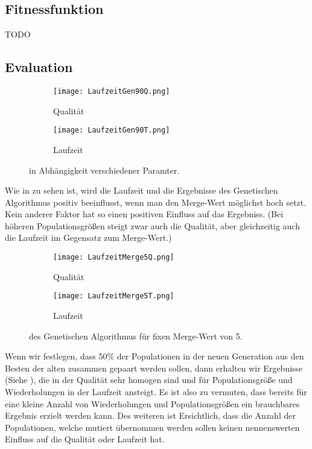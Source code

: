 \subsection{Fitnessfunktion}
TODO



\subsection[Evaluation]{Evaluation\protect\footnotemark}
\label{sec:Evaluation_genAlg}

\begin{figure}
  \begin{subfigure}{\textwidth}
  \texttt{[image: LaufzeitGen90Q.png]}
  \caption{Qualität}
  \end{subfigure}

  \begin{subfigure}{\textwidth}
  \texttt{[image: LaufzeitGen90T.png]}
  \caption{Laufzeit}
  \end{subfigure}
\caption{in Abhängigkeit verschiedener Paramter.}
\label{fig:GenAlgAll}
\end{figure}

Wie in  zu sehen ist, wird die Laufzeit und die Ergebnisse des Genetischen Algorithmus positiv beeinflusst,
wenn man den Merge-Wert möglichst hoch setzt. Kein anderer Faktor hat so einen positiven Einfluss auf das Ergebniss.
(Bei höheren Populationsgrößen steigt zwar auch die Qualität, aber gleichzeitig auch die Laufzeit im Gegensatz zum Merge-Wert.)

\begin{figure}
  \begin{subfigure}{\textwidth}
  \texttt{[image: LaufzeitMerge5Q.png]}
  \caption{Qualität}
  \label{fig:QualitätMerge5}
  \end{subfigure}

  \begin{subfigure}{\textwidth}
  \texttt{[image: LaufzeitMerge5T.png]}
  \caption{Laufzeit}
  \label{fig:LaufzeitMerge5}
  \end{subfigure}
\caption{des Genetischen Algorithmus für fixen Merge-Wert von 5.\protect}
\label{fig:GenAlgMerge5}
\end{figure}

Wenn wir festlegen, dass 50\% der Populationen in der neuen Generation aus den Besten der alten zusammen gepaart werden sollen,
dann erhalten wir Ergebnisse (Siehe ), die in der Qualität sehr homogen sind und für Populationsgröße
und Wiederholungen in der Laufzeit ansteigt.
Es ist also zu vermuten, dass bereits für eine kleine Anzahl von Wiederholungen und Populationsgrößen
ein brauchbares Ergebnis erzielt werden kann.
Des weiteren ist Ersichtlich, dass die Anzahl der Populationen, welche mutiert übernommen werden sollen
keinen nennenswerten Einfluss auf die Qualität oder Laufzeit hat.


